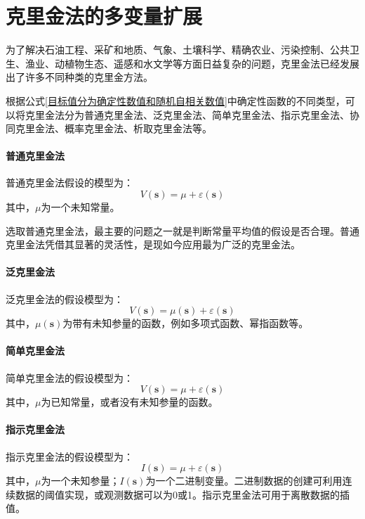 \section{克里金法的多变量扩展}
为了解决石油工程、采矿和地质、气象、土壤科学、精确农业、污染控制、公共卫生、渔业、动植物生态、遥感和水文学等方面日益复杂的问题，克里金法已经发展出了许多不同种类的克里金方法。

根据公式\ref{目标值分为确定性数值和随机自相关数值}中确定性函数的不同类型，可以将克里金法分为普通克里金法、泛克里金法、简单克里金法、指示克里金法、协同克里金法、概率克里金法、析取克里金法等。
\paragraph{普通克里金法}
普通克里金法假设的模型为：
\begin{equation}
    V\left( \mathbf{s} \right) = \mu + \varepsilon \left( \mathbf{s} \right)
\end{equation}
其中，$ \mu $为一个未知常量。

选取普通克里金法，最主要的问题之一就是判断常量平均值的假设是否合理。普通克里金法凭借其显著的灵活性，是现如今应用最为广泛的克里金法。
\paragraph{泛克里金法}
泛克里金法的假设模型为：
\begin{equation}
    V\left( \mathbf{s} \right) = \mu\left( \mathbf{s} \right) + \varepsilon\left( \mathbf{s} \right)
\end{equation}
其中，$ \mu\left( \mathbf{s} \right) $为带有未知参量的函数，例如多项式函数、幂指函数等。
\paragraph{简单克里金法}
简单克里金法的假设模型为：
\begin{equation}
    V\left( \mathbf{s} \right) = \mu + \varepsilon\left( \mathbf{s} \right)
\end{equation}
其中，$ \mu $为已知常量，或者没有未知参量的函数。
\paragraph{指示克里金法}
指示克里金法的假设模型为：
\begin{equation}
    I\left( \mathbf{s} \right) = \mu + \varepsilon\left( \mathbf{s} \right)
\end{equation}
其中，$ \mu $为一个未知参量；$ I\left( \mathbf{s} \right) $为一个二进制变量。二进制数据的创建可利用连续数据的阈值实现，或观测数据可以为0或1。指示克里金法可用于离散数据的插值。
